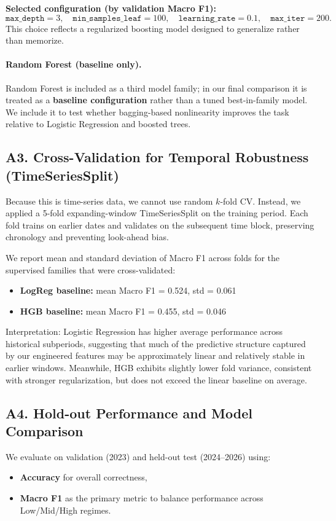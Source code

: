 \documentclass[11pt]{article}
\begin{document}
\textbf{Selected configuration (by validation Macro F1):}
\[
\texttt{max\_depth}=3,\quad \texttt{min\_samples\_leaf}=100,\quad \texttt{learning\_rate}=0.1,\quad \texttt{max\_iter}=200.
\]
This choice reflects a regularized boosting model designed to generalize rather than memorize.

\paragraph{Random Forest (baseline only).}
Random Forest is included as a third model family; in our final comparison it is treated as a \textbf{baseline configuration} rather than a tuned best-in-family model. We include it to test whether bagging-based nonlinearity improves the task relative to Logistic Regression and boosted trees.

\subsection{A3. Cross-Validation for Temporal Robustness (TimeSeriesSplit)}
Because this is time-series data, we cannot use random $k$-fold CV. Instead, we applied a 5-fold expanding-window TimeSeriesSplit on the training period. Each fold trains on earlier dates and validates on the subsequent time block, preserving chronology and preventing look-ahead bias.

We report mean and standard deviation of Macro F1 across folds for the supervised families that were cross-validated:
\begin{itemize}
    \item \textbf{LogReg baseline:} mean Macro F1 = 0.524, std = 0.061
    \item \textbf{HGB baseline:} mean Macro F1 = 0.455, std = 0.046
\end{itemize}
Interpretation: Logistic Regression has higher average performance across historical subperiods, suggesting that much of the predictive structure captured by our engineered features may be approximately linear and relatively stable in earlier windows. Meanwhile, HGB exhibits slightly lower fold variance, consistent with stronger regularization, but does not exceed the linear baseline on average.

\subsection{A4. Hold-out Performance and Model Comparison}
We evaluate on validation (2023) and held-out test (2024--2026) using:
\begin{itemize}
    \item \textbf{Accuracy} for overall correctness,
    \item \textbf{Macro F1} as the primary metric to balance performance across Low/Mid/High regimes.
\end{itemize}
\end{document}
